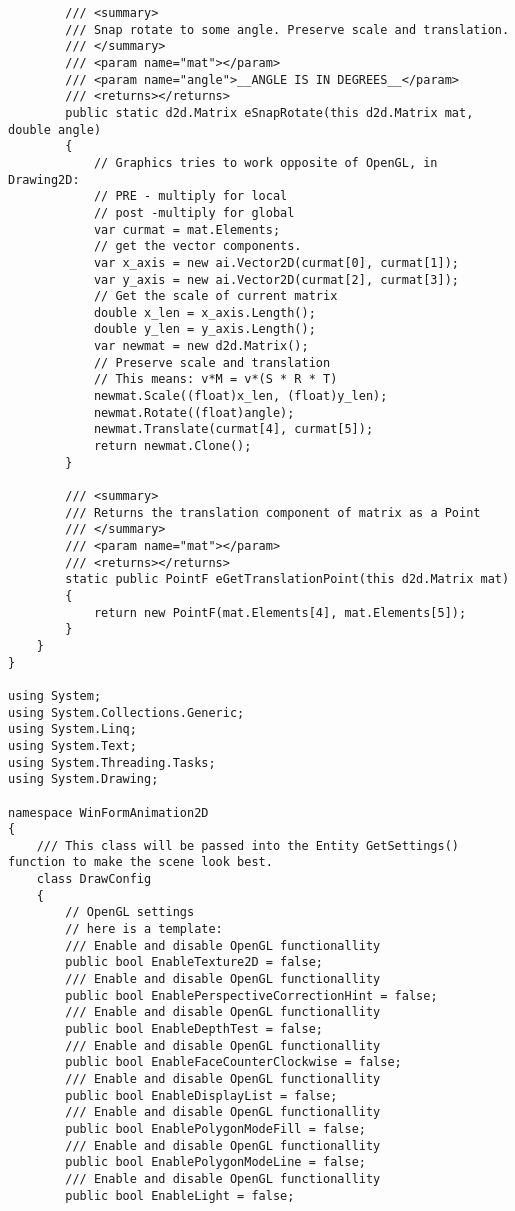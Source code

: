 \begin{scriptsize}
\begin{verbatim}
        /// <summary>
        /// Snap rotate to some angle. Preserve scale and translation.
        /// </summary>
        /// <param name="mat"></param>
        /// <param name="angle">__ANGLE IS IN DEGREES__</param>
        /// <returns></returns>
        public static d2d.Matrix eSnapRotate(this d2d.Matrix mat, double angle)
        {
            // Graphics tries to work opposite of OpenGL, in Drawing2D:
            // PRE - multiply for local
            // post -multiply for global
            var curmat = mat.Elements;
            // get the vector components.
            var x_axis = new ai.Vector2D(curmat[0], curmat[1]);
            var y_axis = new ai.Vector2D(curmat[2], curmat[3]);
            // Get the scale of current matrix
            double x_len = x_axis.Length();
            double y_len = y_axis.Length();
            var newmat = new d2d.Matrix();
            // Preserve scale and translation
            // This means: v*M = v*(S * R * T)
            newmat.Scale((float)x_len, (float)y_len);
            newmat.Rotate((float)angle);
            newmat.Translate(curmat[4], curmat[5]);
            return newmat.Clone();
        }

        /// <summary>
        /// Returns the translation component of matrix as a Point
        /// </summary>
        /// <param name="mat"></param>
        /// <returns></returns>
        static public PointF eGetTranslationPoint(this d2d.Matrix mat)
        {
            return new PointF(mat.Elements[4], mat.Elements[5]);
        }
    }
}

using System;
using System.Collections.Generic;
using System.Linq;
using System.Text;
using System.Threading.Tasks;
using System.Drawing;

namespace WinFormAnimation2D
{
    /// This class will be passed into the Entity GetSettings() function to make the scene look best.
    class DrawConfig
    {
        // OpenGL settings
        // here is a template:
        /// Enable and disable OpenGL functionallity
        public bool EnableTexture2D = false;
        /// Enable and disable OpenGL functionallity
        public bool EnablePerspectiveCorrectionHint = false;
        /// Enable and disable OpenGL functionallity
        public bool EnableDepthTest = false;
        /// Enable and disable OpenGL functionallity
        public bool EnableFaceCounterClockwise = false;
        /// Enable and disable OpenGL functionallity
        public bool EnableDisplayList = false;
        /// Enable and disable OpenGL functionallity
        public bool EnablePolygonModeFill = false;
        /// Enable and disable OpenGL functionallity
        public bool EnablePolygonModeLine = false;
        /// Enable and disable OpenGL functionallity
        public bool EnableLight = false;


\end{verbatim}
\end{scriptsize}
